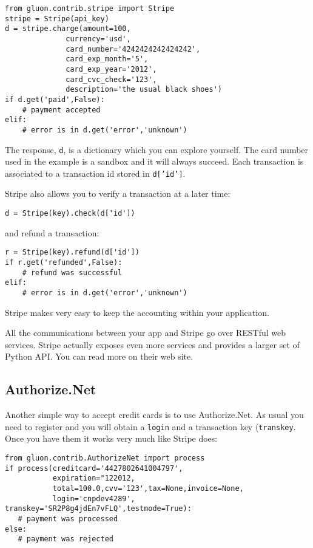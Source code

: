 \documentclass[justified,sixbynine,notoc]{tufte-book}
\def\ft{\small\tt}
\begin{document}
\begin{fullwidth}
\begin{lstlisting}
from gluon.contrib.stripe import Stripe
stripe = Stripe(api_key)
d = stripe.charge(amount=100,
              currency='usd',
              card_number='4242424242424242',
              card_exp_month='5',
              card_exp_year='2012',
              card_cvc_check='123',
              description='the usual black shoes')
if d.get('paid',False):
    # payment accepted
elif:
    # error is in d.get('error','unknown')
\end{lstlisting}

The response, {\ft d}, is a dictionary which you can explore yourself. The card number used in the example is a sandbox and it will always succeed. Each transaction is associated to a transaction id stored in {\ft d['id']}.

Stripe also allows you to verify a transaction at a later time:

\begin{lstlisting}
d = Stripe(key).check(d['id'])
\end{lstlisting}
\noindent and refund a transaction:

\begin{lstlisting}
r = Stripe(key).refund(d['id'])
if r.get('refunded',False):
    # refund was successful
elif:
    # error is in d.get('error','unknown')
\end{lstlisting}

Stripe makes very easy to keep the accounting within your application.

All the communications between your app and Stripe go over RESTful web services. Stripe actually exposes even more services and provides a larger set of Python API. You can read more on their web site.

\goodbreak\subsection{Authorize.Net}

Another simple way to accept credit cards is to use Authorize.Net. As usual you need to register and you will obtain a {\ft login} and a transaction key ({\ft transkey}. Once you have them it works very much like Stripe does:

\begin{lstlisting}
from gluon.contrib.AuthorizeNet import process
if process(creditcard='4427802641004797',
           expiration="122012,
           total=100.0,cvv='123',tax=None,invoice=None,
           login='cnpdev4289', transkey='SR2P8g4jdEn7vFLQ',testmode=True):
   # payment was processed
else:
   # payment was rejected
\end{lstlisting}


\end{fullwidth}
\end{document}
